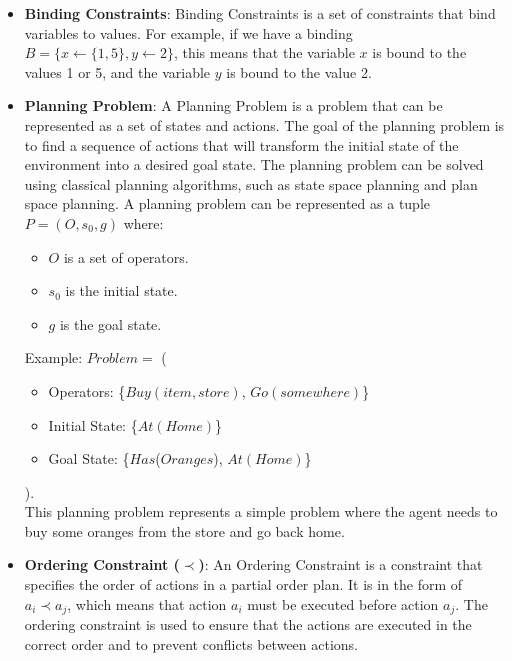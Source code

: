 \begin{itemize}
      \item \label{def:binding_constraint}
            \textbf{Binding Constraints}: Binding Constraints is a set of constraints that bind variables to values.
            For example, if we have a binding $B = \{x \leftarrow \{1,5\}, y \leftarrow 2\}$, this means that the variable $x$ is bound to the values 1 or 5,
            and the variable $y$ is bound to the value 2.

      \item \label{def:planning_problem}
            \textbf{Planning Problem}: A Planning Problem is a problem that can be represented as a set of states and actions. The goal of the planning problem is to find a sequence of actions that will transform the initial state of the environment into a desired goal state. The planning problem can be solved using classical planning algorithms, such as state space planning and plan space planning. A planning problem can be represented as a tuple $P = (O, s_0, g)$ \cite{10.5555/975615} where:
            \begin{itemize}
                  \item $O$ is a set of operators.
                  \item $s_0$ is the initial state.
                  \item $g$ is the goal state.
            \end{itemize}
            Example: $Problem =$ (
            \begin{itemize}
                  \item Operators: \{$Buy(item,store)$, $Go(somewhere)$\}
                  \item Initial State: \{$At(Home)$\}
                  \item Goal State: \{$Has$($Oranges$), $At(Home)$\}
            \end{itemize}
            ).\\
            This planning problem represents a simple problem where the agent needs to buy some oranges from the store and go back home.

      \item  \label{def:ordering_constraint}
            \textbf{Ordering Constraint ($\prec$)}: An Ordering Constraint is a constraint that specifies the order of actions in a partial order plan. It is in the form of $a_i \prec a_j$, which means that action $a_i$ must be executed before action $a_j$. The ordering constraint is used to ensure that the actions are executed in the correct order and to prevent conflicts between actions.


\end{itemize}
